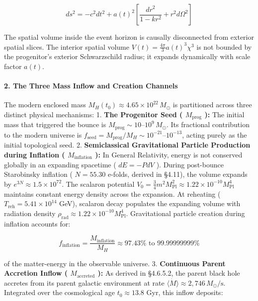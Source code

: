 \documentclass[11pt,a4paper]{article}
\theoremstyle{definition}\newtheorem{definition}{Definition}
\theoremstyle{remark}\newtheorem{remark}{Remark}
\begin{document}
\begin{equation}
ds^2 = -c^2 dt^2 + a(t)^2 \left[ \frac{dr^2}{1 - k r^2} + r^2 d\Omega^2 \right]
\end{equation}


The spatial volume inside the event horizon is causally disconnected from exterior spatial slices. The interior spatial volume $V(t) = \frac{4\pi}{3} a(t)^3 \chi^3$ is not bounded by the progenitor's exterior Schwarzschild radius; it expands dynamically with scale factor $a(t)$.
\paragraph{2. The Three Mass Inflow and Creation Channels}

The modern enclosed mass $M_H(t_0) \approx 4.65 \times 10^{22} \, M_\odot$ is partitioned across three distinct physical mechanisms:
1. \textbf{The Progenitor Seed ( $M_{\text{prog}}$ ):} The initial mass that triggered the bounce is $M_{\text{prog}} \sim 10\text{--}10^9 \, M_\odot$. Its fractional contribution to the modern universe is $f_{\text{seed}} = M_{\text{prog}} / M_H \sim 10^{-21}\text{--}10^{-13}$, acting purely as the initial topological seed.
2. \textbf{Semiclassical Gravitational Particle Production during Inflation ( $M_{\text{inflation}}$ ):} In General Relativity, energy is not conserved globally in an expanding spacetime ( $dE = -P dV$ ). During post-bounce Starobinsky inflation ( $N = 55.30$ e-folds, derived in §4.11), the volume expands by $e^{3N} \approx 1.5 \times 10^{72}$. The scalaron potential $V_0 = \frac{3}{4} m^2 M_{\text{Pl}}^2 \approx 1.22 \times 10^{-10} M_{\text{Pl}}^4$ maintains constant energy density across the expansion. At reheating ( $T_{\text{reh}} = 5.41 \times 10^{14}$ GeV), scalaron decay populates the expanding volume with radiation density $\rho_{\text{rad}} \approx 1.22 \times 10^{-10} M_{\text{Pl}}^4$.
Gravitational particle creation during inflation accounts for:


\begin{equation}
f_{\text{inflation}} = \frac{M_{\text{inflation}}}{M_H} \approx 97.43\% \text{ to } 99.99999999\%
\end{equation}


of the matter-energy in the observable universe.
3. \textbf{Continuous Parent Accretion Inflow ( $M_{\text{accreted}}$ ):} As derived in §4.6.5.2, the parent black hole accretes from its parent galactic environment at rate $\langle\dot{M}\rangle \approx 2{,}746 \, M_\odot/\text{s}$. Integrated over the cosmological age $t_0 \approx 13.8$ Gyr, this inflow deposits:
\end{document}
